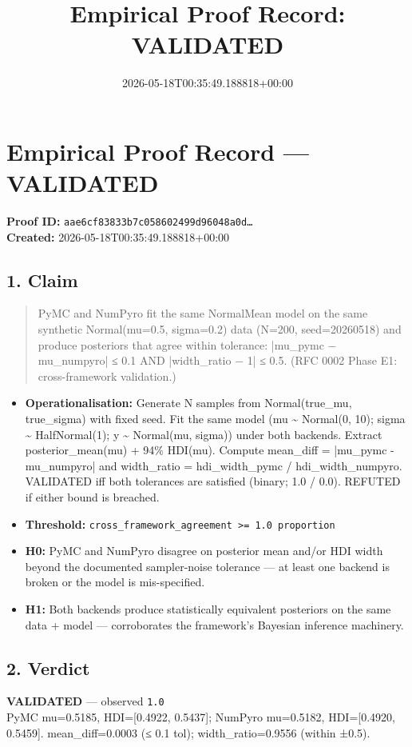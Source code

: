\documentclass{article}
\title{Empirical Proof Record: VALIDATED}
\date{2026-05-18T00:35:49.188818+00:00}
\begin{document}
\maketitle
\section*{Empirical Proof Record --- \textcolor{validated}{\textbf{VALIDATED}}}
\textbf{Proof ID:} \texttt{aae6cf83833b7c058602499d96048a0d\dots}\\
\textbf{Created:} 2026-05-18T00:35:49.188818+00:00
\subsection*{1. Claim}
\begin{quote}PyMC and NumPyro fit the same NormalMean model on the same synthetic Normal(mu=0.5, sigma=0.2) data (N=200, seed=20260518) and produce posteriors that agree within tolerance: |mu\_pymc − mu\_numpyro| ≤ 0.1 AND |width\_ratio − 1| ≤ 0.5. (RFC 0002 Phase E1: cross-framework validation.)\end{quote}
\begin{itemize}
\item \textbf{Operationalisation:} Generate N samples from Normal(true\_mu, true\_sigma) with fixed seed. Fit the same model (mu \textasciitilde{} Normal(0, 10); sigma \textasciitilde{} HalfNormal(1); y \textasciitilde{} Normal(mu, sigma)) under both backends. Extract posterior\_mean(mu) + 94\% HDI(mu). Compute mean\_diff = |mu\_pymc - mu\_numpyro| and width\_ratio = hdi\_width\_pymc / hdi\_width\_numpyro. VALIDATED iff both tolerances are satisfied (binary; 1.0 / 0.0). REFUTED if either bound is breached.
\item \textbf{Threshold:} \texttt{cross\_framework\_agreement >= 1.0 proportion}
\item \textbf{H0:} PyMC and NumPyro disagree on posterior mean and/or HDI width beyond the documented sampler-noise tolerance — at least one backend is broken or the model is mis-specified.
\item \textbf{H1:} Both backends produce statistically equivalent posteriors on the same data + model — corroborates the framework's Bayesian inference machinery.
\end{itemize}
\subsection*{2. Verdict}
\textcolor{validated}{\textbf{VALIDATED}} --- observed \texttt{1.0}\\
PyMC mu=0.5185, HDI=[0.4922, 0.5437]; NumPyro mu=0.5182, HDI=[0.4920, 0.5459]. mean\_diff=0.0003 (≤ 0.1 tol); width\_ratio=0.9556 (within ±0.5).
\end{document}
